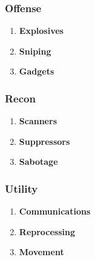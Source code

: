 \subsubsection{Offense}
\begin{enumerate}[label= -]
    \item \textbf{Explosives}
    \item \textbf{Sniping}
    \item \textbf{Gadgets}
\end{enumerate}
\subsubsection{Recon}
\begin{enumerate}[label= -]
    \item \textbf{Scanners}
    \item \textbf{Suppressors}
    \item \textbf{Sabotage}
\end{enumerate}
\subsubsection{Utility}
\begin{enumerate}[label= -]
    \item \textbf{Communications}
    \item \textbf{Reprocessing}
    \item \textbf{Movement}
\end{enumerate}
\par